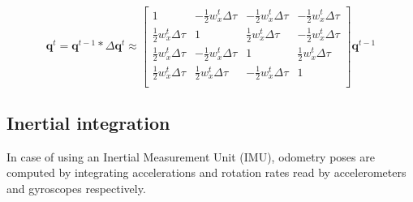 \begin{equation}
\mathbf{q}^t = \mathbf{q}^{t-1}*\Delta\mathbf{q}^t
\approx 
\left[
 \begin{array}{cccc}
  1 & -\frac{1}{2}w^t_x\Delta\tau & -\frac{1}{2}w^t_x\Delta\tau & -\frac{1}{2}w^t_x\Delta\tau\\
  \frac{1}{2}w^t_x\Delta\tau & 1 & \frac{1}{2}w^t_x\Delta\tau & -\frac{1}{2}w^t_x\Delta\tau\\
  \frac{1}{2}w^t_x\Delta\tau & -\frac{1}{2}w^t_x\Delta\tau & 1 & \frac{1}{2}w^t_x\Delta\tau\\
  \frac{1}{2}w^t_x\Delta\tau & \frac{1}{2}w^t_x\Delta\tau & -\frac{1}{2}w^t_x\Delta\tau & 1\\
 \end{array}
 \right]
 \mathbf{q}^{t-1}
\end{equation}


\subsection{Inertial integration}
In case of using an Inertial Measurement Unit (IMU), odometry poses are computed by integrating accelerations and rotation rates read by accelerometers and gyroscopes respectively.


